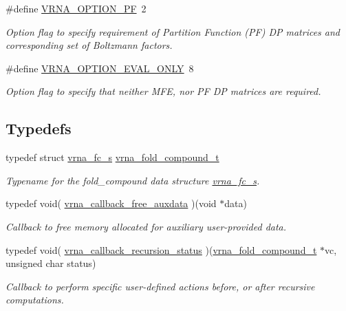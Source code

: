 \begin{DoxyCompactItemize}
\#define \hyperlink{group__fold__compound_gabfbadcddda3e74ce7f49035ef8f058f7}{V\-R\-N\-A\-\_\-\-O\-P\-T\-I\-O\-N\-\_\-\-P\-F}~2
\begin{DoxyCompactList}\small\item\em Option flag to specify requirement of Partition Function (P\-F) D\-P matrices and corresponding set of Boltzmann factors. \end{DoxyCompactList}\item 
\#define \hyperlink{group__fold__compound_ga61469c423131552c8483229f8b6c7e0e}{V\-R\-N\-A\-\_\-\-O\-P\-T\-I\-O\-N\-\_\-\-E\-V\-A\-L\-\_\-\-O\-N\-L\-Y}~8
\begin{DoxyCompactList}\small\item\em Option flag to specify that neither M\-F\-E, nor P\-F D\-P matrices are required. \end{DoxyCompactList}\end{DoxyCompactItemize}
\subsection*{Typedefs}
\begin{DoxyCompactItemize}
\item 
\hypertarget{group__fold__compound_ga1b0cef17fd40466cef5968eaeeff6166}{typedef struct \hyperlink{group__fold__compound_structvrna__fc__s}{vrna\-\_\-fc\-\_\-s} \hyperlink{group__fold__compound_ga1b0cef17fd40466cef5968eaeeff6166}{vrna\-\_\-fold\-\_\-compound\-\_\-t}}\label{group__fold__compound_ga1b0cef17fd40466cef5968eaeeff6166}

\begin{DoxyCompactList}\small\item\em Typename for the fold\-\_\-compound data structure \hyperlink{group__fold__compound_structvrna__fc__s}{vrna\-\_\-fc\-\_\-s}. \end{DoxyCompactList}\item 
typedef void( \hyperlink{group__fold__compound_ga75aaf7b809290de808e545877a9e20f7}{vrna\-\_\-callback\-\_\-free\-\_\-auxdata} )(void $\ast$data)
\begin{DoxyCompactList}\small\item\em Callback to free memory allocated for auxiliary user-\/provided data. \end{DoxyCompactList}\item 
typedef void( \hyperlink{group__fold__compound_ga9fafb3f0217e27339bb9faf61a03e723}{vrna\-\_\-callback\-\_\-recursion\-\_\-status} )(\hyperlink{group__fold__compound_ga1b0cef17fd40466cef5968eaeeff6166}{vrna\-\_\-fold\-\_\-compound\-\_\-t} $\ast$vc, unsigned char status)
\begin{DoxyCompactList}\small\item\em Callback to perform specific user-\/defined actions before, or after recursive computations. \end{DoxyCompactList}\end{DoxyCompactItemize}
